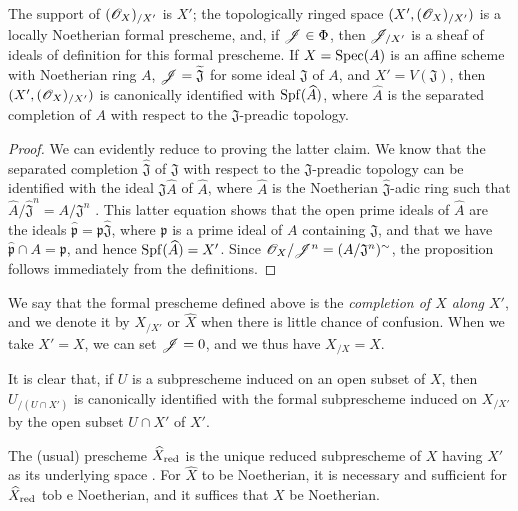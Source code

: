 \begin{proposition}[10.8.5]
\label{1.10.8.5}
The support of $(\mathscr{O}_X)_{/X'}$ is $X'$; the topologically ringed space $(X',(\mathscr{O}_X)_{/X'})$ is a locally Noetherian formal prescheme, and, if $\mathscr{J}\in\Phi$, then $\mathscr{J}_{/X'}$ is a sheaf of ideals of definition for this formal prescheme.
If $X=\operatorname{Spec}(A)$ is an affine scheme with Noetherian ring $A$, $\mathscr{J}=\widetilde{\mathfrak{J}}$ for some ideal $\mathfrak{J}$ of $A$, and $X'=V(\mathfrak{J})$, then $(X',(\mathscr{O}_X)_{/X'})$ is canonically identified with $\operatorname{Spf}(\widehat{A})$, where $\widehat{A}$ is the separated completion of $A$ with respect to the $\mathfrak{J}$-preadic topology.
\end{proposition}

\begin{proof}
\label{proof-1.10.8.5}
We can evidently reduce to proving the latter claim.
We know  that the separated completion $\widehat{\mathfrak{J}}$ of $\mathfrak{J}$ with respect to the $\mathfrak{J}$-preadic topology can be identified with the ideal $\mathfrak{J}\widehat{A}$ of $\widehat{A}$, where $\widehat{A}$ is the Noetherian $\widehat{\mathfrak{J}}$-adic ring such that $\widehat{A}/\widehat{\mathfrak{J}}^n=A/\mathfrak{J}^n$ .
This latter equation shows that the open prime ideals of $\widehat{A}$ are the ideals $\widehat{\mathfrak{p}}=\mathfrak{p}\widehat{\mathfrak{J}}$, where $\mathfrak{p}$ is a prime ideal of $A$ containing $\mathfrak{J}$, and that we have $\widehat{\mathfrak{p}}\cap A=\mathfrak{p}$, and hence $\operatorname{Spf}(\widehat{A})=X'$.
Since $\mathscr{O}_X/\mathscr{J}^n=(A/\mathfrak{J}^n)^\sim$, the proposition follows immediately from the definitions.
\end{proof}

We say that the formal prescheme defined above is the \emph{completion of $X$ along $X'$}, and we denote it by $X_{/X'}$ or $\widehat{X}$ when there is little chance of confusion.
When we take $X'=X$, we can set $\mathscr{J}=0$, and we thus have $X_{/X}=X$.

It is clear that, if $U$ is a subprescheme induced on an open subset of $X$, then $U_{/(U\cap X')}$ is canonically identified with the formal subprescheme induced on $X_{/X'}$ by the open subset $U\cap X'$ of $X'$.

\begin{corollary}[10.8.6]
\label{1.10.8.6}
The (usual) prescheme $\widehat{X}_{\mathrm{red}}$ is the unique reduced subprescheme of $X$ having $X'$ as its underlying space .
For $\widehat{X}$ to be Noetherian, it is necessary and sufficient for $\widehat{X}_{\mathrm{red}}$ tob e Noetherian, and it suffices that $X$ be Noetherian.
\end{corollary}

